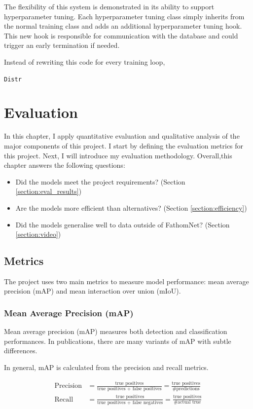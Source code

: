 \documentclass[12pt,a4paper,twoside,openany]{report}
\begin{document}
The flexibility of this system is demonstrated in its ability to support hyperparameter tuning. Each hyperparameter tuning class simply inherits from the normal training class and adds an additional hyperparameter tuning hook. This new hook is responsible for communication with the database and could trigger an early termination if needed. 

Instead of rewriting this code for every training loop, 


\verb|Distr|


\chapter{Evaluation}

In this chapter, I apply quantitative evaluation and qualitative analysis of the major components of this project. I start by defining the evaluation metrics for this project. Next, I will introduce my evaluation methodology. Overall,this chapter answers the following questions:

\begin{itemize}
    \item Did the models meet the project requirements? (Section \ref{section:eval_results})
    \item Are the models more efficient than alternatives? (Section \ref{section:efficiency})
    \item Did the models generalise well to data outside of FathomNet? (Section \ref{section:video})
\end{itemize}


\section{Metrics}
The project uses two main metrics to measure model performance: mean average precision (mAP) and mean interaction over union (mIoU). 

\subsection{Mean Average Precision (mAP)} \label{section:define_mAP}
Mean average precision (mAP) measures both detection and classification performances. In publications, there are many variants of mAP with subtle differences.

In general, mAP is calculated from the precision and recall metrics. 

\begin{align*}
    \text{Precision} &= \frac{\text{true positives}}{\text{true positives + false positives}} = \frac{\text{true positives}}{\text{\# predictions}}\\
    \text{Recall} &= \frac{\text{true positives}}{\text{true positives + false negatives}} = \frac{\text{true positives}}{\text{\# actual true}}\\
\end{align*}
\end{document}
